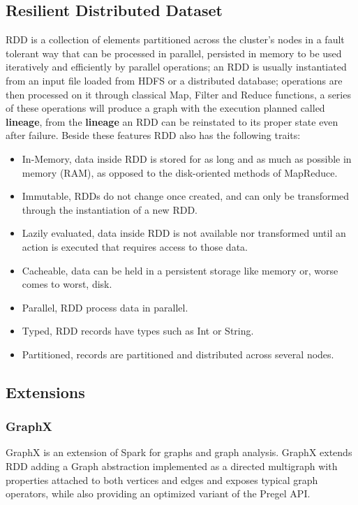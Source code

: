 \subsection{Resilient Distributed Dataset}
RDD is a collection of elements partitioned across the cluster's nodes in a fault tolerant way that can be processed in parallel, persisted in memory to be used iteratively and efficiently by parallel operations; an RDD is usually instantiated from an input file loaded from HDFS or a distributed database; operations are then processed on it through classical Map, Filter and Reduce functions, a series of these operations will produce a graph with the execution planned called \textbf{lineage}, from the \textbf{lineage} an RDD can be reinstated to its proper state even after failure.
Beside these features RDD also has the following traits:
\begin{itemize}
	\item In-Memory, data inside RDD is stored for as long and as much as possible in memory (RAM), as opposed to the disk-oriented methods of MapReduce.
	\item Immutable, RDDs do not change once created, and can only be transformed through the instantiation of a new RDD.
	\item Lazily evaluated, data inside RDD is not available nor transformed until an action is executed that requires access to those data.
	\item Cacheable, data can be held in a persistent storage like memory or, worse comes to worst, disk.
	\item Parallel, RDD process data in parallel.
	\item Typed, RDD records have types such as Int or String.
	\item Partitioned, records are partitioned and distributed across several nodes.
\end{itemize}

\subsection{Extensions}
\subsubsection{GraphX}

GraphX is an extension of Spark for graphs and graph analysis. GraphX extends RDD adding a Graph abstraction implemented as a directed multigraph with properties attached to both vertices and edges and exposes typical graph operators, while also providing an optimized variant of the Pregel API.

